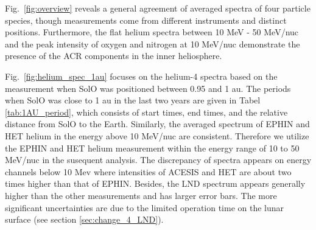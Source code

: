 Fig.~\ref{fig:overview} reveals a general agreement of averaged spectra of four particle species, though measurements come from different instruments and distinct positions. Furthermore, the flat helium spectra between 10 MeV - 50 MeV/nuc and the peak intensity of oxygen and nitrogen at 10 MeV/nuc demonstrate the presence of the \ac{ACR} components in the inner heliosphere. 

Fig.~\ref{fig:helium_spec_1au} focuses on the helium-4 spectra based on the measurement when \ac{SolO} was positioned between 0.95 and 1 au. The periods when \ac{SolO} was close to 1 au in the last two years are given in Tabel \ref{tab:1AU_period}, which consists of start times, end times, and the relative distance from \ac{SolO} to the Earth.
Similarly, the averaged spectrum of \ac{EPHIN} and \ac{HET} helium in the energy above 10 MeV/nuc are consistent. Therefore we utilize the \ac{EPHIN} and \ac{HET} helium measurement within the energy range of 10 to 50 MeV/nuc in the susequent analysis.
The discrepancy of spectra appears on energy channels below 10 Mev where intensities of \ac{ACESIS} and \ac{HET} are about two times higher than that of \ac{EPHIN}. Besides, the \ac{LND} spectrum appears generally higher than the other measurements and has larger error bars. The more significant uncertainties are due to the limited operation time on the lunar surface (see section \ref{sec:change_4_LND}).



